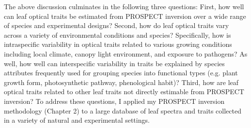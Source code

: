The above discussion culminates in the following three questions:
First, how well can leaf optical traits be estimated from PROSPECT inversion over a wide range of species and experimental designs?
Second, how do leaf optical traits vary across a variety of environmental conditions and species?
Specifically, how is intraspecific variability in optical traits related to various growing conditions including local climate, canopy light environment, and exposure to pathogens?
As well, how well can interspecific variability in traits be explained by species attributes frequently used for grouping species into functional types (e.g. plant growth form, photosynthetic pathway, phenological habit)? 
Third, how are leaf optical traits related to other leaf traits not directly estimable from PROSPECT inversion?
To address these questions, I applied my PROSPECT inversion methodology (Chapter 2) to a large database of leaf spectra and traits collected in a variety of natural and experimental settings.
